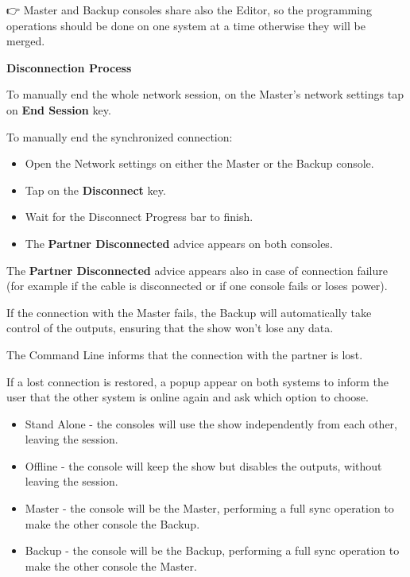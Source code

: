 \documentclass[
]{article}
\providecommand{\tightlist}{%
  \setlength{\itemsep}{0pt}\setlength{\parskip}{0pt}}
\begin{document}
👉 Master and Backup consoles share also the Editor, so the programming operations should be done on one system at a time otherwise they will be merged.

\textbf{Disconnection Process}

To manually end the whole network session, on the Master's network settings tap on \textbf{End Session} key.

To manually end the synchronized connection:

\begin{itemize}
\item
  Open the Network settings on either the Master or the Backup console.
\item
  Tap on the \textbf{Disconnect} key.
\end{itemize}

\begin{itemize}
\tightlist
\item
  Wait for the Disconnect Progress bar to finish.
\end{itemize}

\begin{itemize}
\tightlist
\item
  The \textbf{Partner Disconnected} advice appears on both consoles.
\end{itemize}

The \textbf{Partner Disconnected} advice appears also in case of connection failure (for example if the cable is disconnected or if one console fails or loses power).

If the connection with the Master fails, the Backup will automatically take control of the outputs, ensuring that the show won't lose any data.

The Command Line informs that the connection with the partner is lost.

If a lost connection is restored, a popup appear on both systems to inform the user that the other system is online again and ask which option to choose.

\begin{itemize}
\item
  Stand Alone - the consoles will use the show independently from each other, leaving the session.
\item
  Offline - the console will keep the show but disables the outputs, without leaving the session.
\item
  Master - the console will be the Master, performing a full sync operation to make the other console the Backup.
\item
  Backup - the console will be the Backup, performing a full sync operation to make the other console the Master.
\end{itemize}
\end{document}
